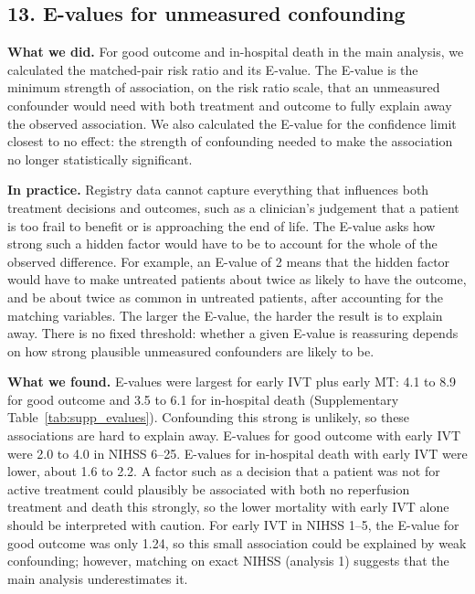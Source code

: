 \subsection*{13. E-values for unmeasured confounding}

\textbf{What we did.} For good outcome and in-hospital death in the main analysis, we calculated the matched-pair risk ratio and its E-value\cite{vanderweele_sensitivity_2017}. The E-value is the minimum strength of association, on the risk ratio scale, that an unmeasured confounder would need with both treatment and outcome to fully explain away the observed association. We also calculated the E-value for the confidence limit closest to no effect: the strength of confounding needed to make the association no longer statistically significant.

\textbf{In practice.} Registry data cannot capture everything that influences both treatment decisions and outcomes, such as a clinician's judgement that a patient is too frail to benefit or is approaching the end of life. The E-value asks how strong such a hidden factor would have to be to account for the whole of the observed difference. For example, an E-value of 2 means that the hidden factor would have to make untreated patients about twice as likely to have the outcome, and be about twice as common in untreated patients, after accounting for the matching variables. The larger the E-value, the harder the result is to explain away. There is no fixed threshold: whether a given E-value is reassuring depends on how strong plausible unmeasured confounders are likely to be.

\textbf{What we found.} E-values were largest for early IVT plus early MT: 4.1 to 8.9 for good outcome and 3.5 to 6.1 for in-hospital death (Supplementary Table~\ref{tab:supp_evalues}). Confounding this strong is unlikely, so these associations are hard to explain away. E-values for good outcome with early IVT were 2.0 to 4.0 in NIHSS 6--25. E-values for in-hospital death with early IVT were lower, about 1.6 to 2.2. A factor such as a decision that a patient was not for active treatment could plausibly be associated with both no reperfusion treatment and death this strongly, so the lower mortality with early IVT alone should be interpreted with caution. For early IVT in NIHSS 1--5, the E-value for good outcome was only 1.24, so this small association could be explained by weak confounding; however, matching on exact NIHSS (analysis 1) suggests that the main analysis underestimates it.

